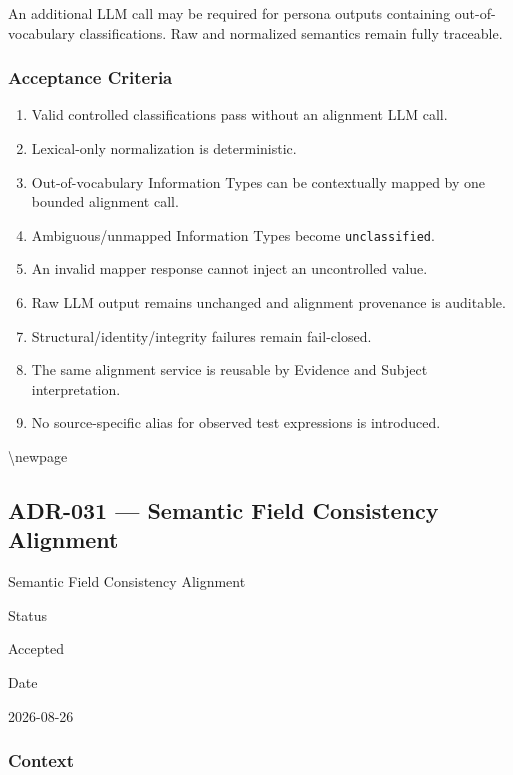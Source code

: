 An additional LLM call may be required for persona outputs containing out-of-vocabulary classifications. Raw and normalized semantics remain fully traceable.

\hypertarget{acceptance-criteria-3}{%
\subsubsection{Acceptance Criteria}\label{acceptance-criteria-3}}

\begin{enumerate}
\def\labelenumi{\arabic{enumi}.}
\tightlist
\item
  Valid controlled classifications pass without an alignment LLM call.
\item
  Lexical-only normalization is deterministic.
\item
  Out-of-vocabulary Information Types can be contextually mapped by one bounded alignment call.
\item
  Ambiguous/unmapped Information Types become \texttt{unclassified}.
\item
  An invalid mapper response cannot inject an uncontrolled value.
\item
  Raw LLM output remains unchanged and alignment provenance is auditable.
\item
  Structural/identity/integrity failures remain fail-closed.
\item
  The same alignment service is reusable by Evidence and Subject interpretation.
\item
  No source-specific alias for observed test expressions is introduced.
\end{enumerate}

\textbackslash newpage

\hypertarget{adr-031--semantic-field-consistency-alignment}{%
\subsection{ADR-031 --- Semantic Field Consistency Alignment}\label{adr-031--semantic-field-consistency-alignment}}

Semantic Field Consistency Alignment

Status

Accepted

Date

2026-08-26

\hypertarget{context-17}{%
\subsubsection{Context}\label{context-17}}

